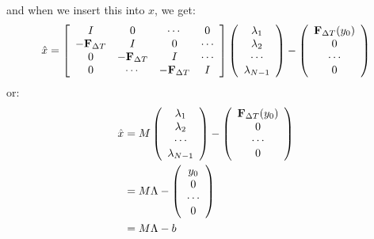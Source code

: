 \documentclass[11pt,a4paper]{article}
\begin{document}
and when we insert this into $x$, we get:
\begin{align}
\hat{x} = \left[ \begin{array}{cccc}
   I & 0 & \cdots & 0 \\  
   -\bold{F}_{\Delta T} & I & 0 & \cdots \\ 
   0 &-\bold{F}_{\Delta T} & I  & \cdots \\
   0 &\cdots &-\bold{F}_{\Delta T} & I   \\
   \end{array}  \right]
   \left( \begin{array}{c}
   \lambda_1 \\  
   \lambda_2 \\ 
   \cdots  \\
   \lambda_{N-1}  \\
   \end{array}  \right) -
   \left( \begin{array}{c}
   \bold{F}_{\Delta T}(y_0)\\  
   0\\ 
   \cdots  \\
   0  \\
   \end{array}  \right)
\end{align}
or:
\begin{align}
\hat{x} &= M \left( \begin{array}{c}
   \lambda_1 \\  
   \lambda_2 \\ 
   \cdots  \\
   \lambda_{N-1}  \\
   \end{array}  \right) -
   \left( \begin{array}{c}
   \bold{F}_{\Delta T}(y_0)\\  
   0\\ 
   \cdots  \\
   0  \\
   \end{array}  \right) \\
   & = M \Lambda -\left( \begin{array}{c}
   y_0\\  
   0\\ 
   \cdots  \\
   0  \\
   \end{array}  \right) \\
   &=M \Lambda-b
\end{align}
\end{document}
